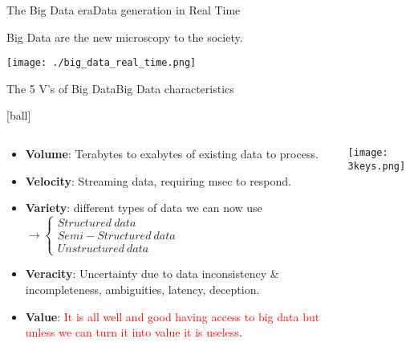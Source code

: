 \documentclass{standalone}
\begin{document}
\begin{frame}{The Big Data era}{Data generation in Real Time}

  \centering Big Data are the new microscopy to  the society.

  \vspace{0.3cm}

  \centering\texttt{[image: ./big\_data\_real\_time.png]}

\end{frame}



\begin{frame}{The 5 V's of Big Data}{Big Data characteristics}

  [ball]

  \begin{columns}
    \begin{column}{0.5\textwidth}

      \begin{itemize}
        \setlength\itemsep{1em}

        \item \textbf{Volume}: Terabytes to exabytes of existing data to process.

        \item \textbf{Velocity}: Streaming data, requiring msec to respond.

        \item \textbf{Variety}: different types of data we can now use $\xrightarrow{}\begin{cases}Structured\ data\\Semi-Structured\ data\\Unstructured\ data
        \end{cases}$

        \item \textbf{Veracity}: Uncertainty due to data inconsistency \& incompleteness, ambiguities, latency, deception.

        \item \textbf{Value}: \textcolor{red}{It is all well and good having access to big data but unless we can turn it into value it is useless}.
      \end{itemize}
    \end{column}

    \begin{column}{0.4\textwidth}
      \centering\texttt{[image: 3keys.png]}
    \end{column}

  \end{columns}
\end{frame}
\end{document}
